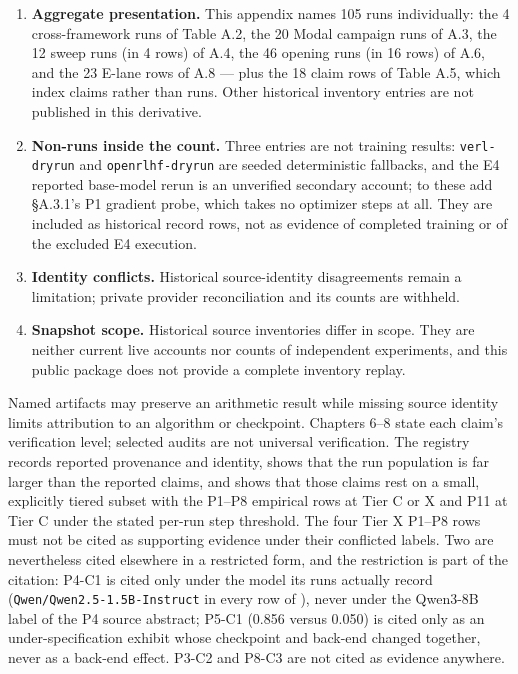\documentclass[12pt,a4paper]{report}
\DeclareRobustCommand{\longtok}[1]{\texttt{\seqsplit{#1}}}
\begin{document}
\begin{enumerate}
\def\labelenumi{\arabic{enumi}.}
\item
  \textbf{Aggregate presentation.} This appendix names 105 runs
  individually: the 4 cross-framework runs of Table A.2, the 20 Modal
  campaign runs of A.3, the 12 sweep runs (in 4 rows) of A.4, the 46
  opening runs (in 16 rows) of A.6, and the 23 E-lane rows of A.8 ---
  plus the 18 claim rows of Table A.5, which index claims rather than
  runs. Other historical inventory entries are not published in this
  derivative.
\item
  \textbf{Non-runs inside the count.} Three entries are not training
  results: \texttt{verl-dryrun} and \texttt{openrlhf-dryrun} are seeded
  deterministic fallbacks, and the E4 reported base-model rerun is an
  unverified secondary account; to these add §A.3.1's P1 gradient probe,
  which takes no optimizer steps at all. They are included as historical
  record rows, not as evidence of completed training or of the excluded
  E4 execution.
\item
  \textbf{Identity conflicts.} Historical source-identity disagreements
  remain a limitation; private provider reconciliation and its counts
  are withheld.
\item
  \textbf{Snapshot scope.} Historical source inventories differ in
  scope. They are neither current live accounts nor counts of
  independent experiments, and this public package does not provide a
  complete inventory replay.
\end{enumerate}

Named artifacts may preserve an arithmetic result while missing source
identity limits attribution to an algorithm or checkpoint. Chapters 6--8
state each claim's verification level; selected audits are not universal
verification. The registry records reported provenance and identity,
shows that the run population is far larger than the reported claims,
and shows that those claims rest on a small, explicitly tiered subset
with the P1--P8 empirical rows at Tier C or X and P11 at Tier C under
the stated per-run step threshold. The four Tier X P1--P8 rows must not
be cited as supporting evidence under their conflicted labels. Two are
nevertheless cited elsewhere in a restricted form, and the restriction
is part of the citation: P4-C1 is cited only under the model its runs
actually record (\texttt{Qwen/Qwen2.5-1.5B-Instruct} in every row of
\longtok{results/drgrpo\_\allowbreak{}gsm8k\_\allowbreak{}cot\_\allowbreak{}full.json}), never under the
Qwen3-8B label of the P4 source abstract; P5-C1 (0.856 versus 0.050) is
cited only as an under-specification exhibit whose checkpoint and
back-end changed together, never as a back-end effect. P3-C2 and P8-C3
are not cited as evidence anywhere.
\end{document}
